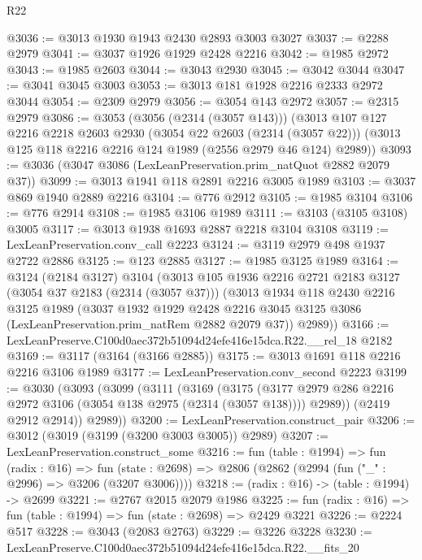 \begin{lexlean}{R22}
\begin{coremodule}
@3036 := @3013 @1930 @1943 @2430 @2893 @3003 @3027
@3037 := @2288 @2979
@3041 := @3037 @1926 @1929 @2428 @2216
@3042 := @1985 @2972
@3043 := @1985 @2603
@3044 := @3043 @2930
@3045 := @3042 @3044
@3047 := @3041 @3045 @3003
@3053 := @3013 @181 @1928 @2216 @2333 @2972 @3044
@3054 := @2309 @2979
@3056 := @3054 @143 @2972
@3057 := @2315 @2979
@3086 := @3053
    (@3056 (@2314 (@3057 @143)))
    (@3013
      @107
      @127
      @2216
      @2218
      @2603
      @2930
      (@3054 @22 @2603 (@2314 (@3057 @22)))
      (@3013 @125 @118 @2216 @2216 @124 @1989 (@2556 @2979 @46 @124) @2989))
@3093 := @3036 (@3047 @3086 (LexLeanPreservation.prim_natQuot @2882 @2079 @37))
@3099 := @3013 @1941 @118 @2891 @2216 @3005 @1989
@3103 := @3037 @869 @1940 @2889 @2216
@3104 := @776 @2912
@3105 := @1985 @3104
@3106 := @776 @2914
@3108 := @1985 @3106 @1989
@3111 := @3103 (@3105 @3108) @3005
@3117 := @3013 @1938 @1693 @2887 @2218 @3104 @3108
@3119 := LexLeanPreservation.conv_call @2223
@3124 := @3119 @2979 @498 @1937 @2722 @2886
@3125 := @123 @2885
@3127 := @1985 @3125 @1989
@3164 := @3124
    (@2184 @3127)
    @3104
    (@3013
      @105
      @1936
      @2216
      @2721
      @2183
      @3127
      (@3054 @37 @2183 (@2314 (@3057 @37)))
      (@3013
        @1934
        @118
        @2430
        @2216
        @3125
        @1989
        (@3037
          @1932
          @1929
          @2428
          @2216
          @3045
          @3125
          @3086
          (LexLeanPreservation.prim_natRem @2882 @2079 @37))
        @2989))
@3166 := LexLeanPreserve.C100d0aec372b51094d24efe416e15dca.R22.__rel_18 @2182
@3169 := @3117 (@3164 (@3166 @2885))
@3175 := @3013 @1691 @118 @2216 @2216 @3106 @1989
@3177 := LexLeanPreservation.conv_second @2223
@3199 := @3030
    (@3093
      (@3099
        (@3111
          (@3169
            (@3175
              (@3177 @2979 @286 @2216 @2972 @3106 (@3054 @138 @2975 (@2314 (@3057 @138))))
              @2989))
          (@2419 @2912 @2914))
        @2989))
@3200 := LexLeanPreservation.construct_pair
@3206 := @3012 (@3019 (@3199 (@3200 @3003 @3005)) @2989)
@3207 := LexLeanPreservation.construct_some
@3216 := fun (table : @1994) =>
  fun (radix : @16) =>
  fun (state : @2698) => @2806 (@2862 (@2994 (fun ("_" : @2996) => @3206 (@3207 @3006))))
@3218 := (radix : @16) -> (table : @1994) -> @2699
@3221 := @2767 @2015 @2079 @1986
@3225 := fun (radix : @16) => fun (table : @1994) => fun (state : @2698) => @2429 @3221
@3226 := @2224 @517
@3228 := @3043 (@2083 @2763)
@3229 := @3226 @3228
@3230 := LexLeanPreserve.C100d0aec372b51094d24efe416e15dca.R22.__fits_20

\end{coremodule}
\end{lexlean}

